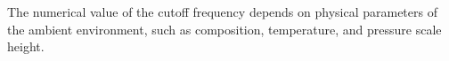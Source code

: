 
The numerical value of the cutoff
frequency depends on physical parameters of the ambient environment,
such as composition, temperature, and pressure scale height.
